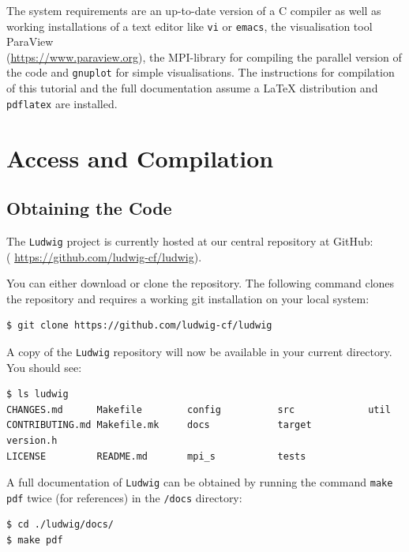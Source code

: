 \documentclass[11pt,twoside,a4paper]{article}
\begin{document}
The system requirements are an up-to-date version of a C compiler as well as working installations 
of a text editor like \texttt{vi} or \texttt{emacs}, the visualisation tool
ParaView \\
({\color{blue}\hyperref[ParaView]{https://www.paraview.org}}), the MPI-library 
for compiling the parallel version of the code and \texttt{gnuplot} for simple visualisations.
The instructions for compilation of this tutorial and the full documentation assume a LaTeX distribution
and \texttt{pdflatex} are installed.

\section{Access and Compilation}

\subsection{Obtaining the Code}
\label{sec:getCode}

The \texttt{Ludwig} project is currently hosted at our central repository at GitHub:\\
({\color{blue} \hyperref[GitHubLudwig]{https://github.com/ludwig-cf/ludwig}}).
\smallskip

You can either download or clone the repository. 
The following command clones the repository and requires a working 
git installation on your local system:

\begin{lstlisting}[style=terminalverbatim]
$ git clone https://github.com/ludwig-cf/ludwig
\end{lstlisting}

A copy of the \texttt{Ludwig} repository will now be available in your current directory. 
You should see:

\begin{lstlisting}
$ ls ludwig
CHANGES.md      Makefile        config          src             util
CONTRIBUTING.md Makefile.mk     docs            target          version.h
LICENSE         README.md       mpi_s           tests
\end{lstlisting}

A full documentation of \texttt{Ludwig} can be obtained by running 
the command \texttt{make pdf} twice (for references) in the \texttt{/docs} directory:

\begin{lstlisting}[style=terminalverbatim]
$ cd ./ludwig/docs/
$ make pdf
\end{lstlisting}
\end{document}
